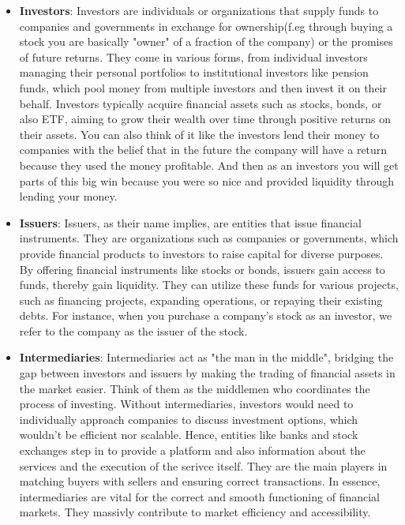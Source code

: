 \documentclass{article}
\begin{document}
\begin{itemize}
\item \textbf{Investors}:
Investors are individuals or organizations that supply funds to companies and governments in exchange for ownership(f.eg through buying a stock you are basically "owner" of a fraction of the company) or the promises of future returns. They come in various forms, from individual investors managing their personal portfolios to institutional investors like pension funds, which pool money from multiple investors and then invest it on their behalf. Investors typically acquire financial assets such as stocks, bonds, or also ETF, aiming to grow their wealth over time through positive returns on their assets. You can also think of it like the investors lend their money to companies with the belief that in the future the company will have a return because they used the money profitable. And then as an investors you will get parts of this big win because you were so nice and provided liquidity through lending your money.

\item \textbf{Issuers}:
Issuers, as their name implies, are entities that issue financial instruments. They are organizations such as companies or governments, which provide financial products to investors to raise capital for diverse purposes. By offering financial instruments like stocks or bonds, issuers gain access to funds, thereby gain liquidity. They can utilize these funds for various projects, such as financing projects, expanding operations, or repaying their existing debts. For instance, when you purchase a company's stock as an investor, we refer to the company as the issuer of the stock.

\item \textbf{Intermediaries}:
Intermediaries act as "the man in the middle", bridging the gap between investors and issuers by making the trading of financial assets in the market easier. Think of them as the middlemen who coordinates the process of investing. Without intermediaries, investors would need to individually approach companies to discuss investment options, which wouldn't be  efficient nor scalable. Hence, entities like banks and stock exchanges step in to provide a platform and also information about the services and the execution of the serivce itself. They are the main players in matching buyers with sellers and ensuring correct transactions. In essence, intermediaries are vital for the correct and smooth functioning of financial markets. They massivly contribute to market efficiency and accessibility.


\end{itemize}
\end{document}
